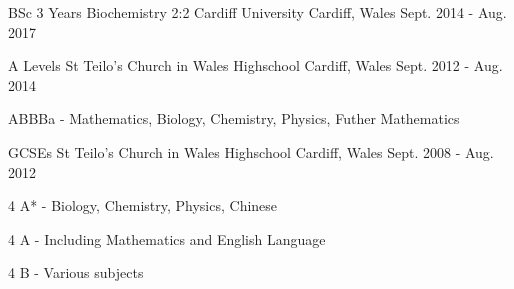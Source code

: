 

\begin{cventries}

  \cventry
    {BSc 3 Years Biochemistry 2:2} %
    {Cardiff University} %
    {Cardiff, Wales} %
    {Sept. 2014 - Aug. 2017} %
    {
      \begin{cvitems} %
      \end{cvitems}
    }

\cventry
    {A Levels} %
    {St Teilo's Church in Wales Highschool} %
    {Cardiff, Wales} %
    {Sept. 2012 - Aug. 2014} %
    {
      \begin{cvitems} %
        \item {ABBBa - Mathematics, Biology, Chemistry, Physics, Futher Mathematics}
      \end{cvitems}
    }

\cventry
    {GCSEs} %
    {St Teilo's Church in Wales Highschool} %
    {Cardiff, Wales} %
    {Sept. 2008 - Aug. 2012} %
    {
      \begin{cvitems} %
        \item {4 A*  - Biology, Chemistry, Physics, Chinese}
        \item {4 A  - Including Mathematics and English Language}
        \item {4 B  - Various subjects}
      \end{cvitems}
    }    

\end{cventries}
